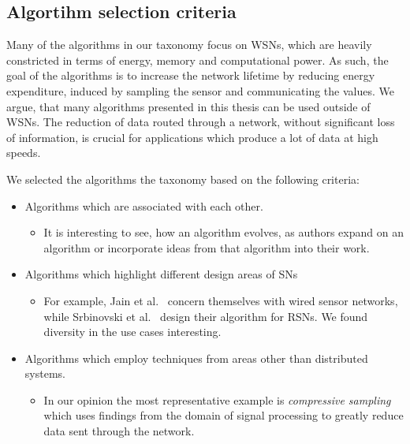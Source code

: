 \subsection{Algortihm selection criteria}
\label{sec:Algortihm selection criteria}

Many of the algorithms in our taxonomy focus on \acp{WSN}, which are heavily
constricted in terms of energy, memory and computational power. As such, the
goal of the algorithms is to increase the network lifetime by reducing energy
expenditure, induced by sampling the sensor and communicating the values. We
argue, that many algorithms presented in this thesis can be used outside of
\acp{WSN}. The reduction of data routed through a network, without significant
loss of information, is crucial for applications which produce a lot of data at
high speeds.

We selected the algorithms the taxonomy based on the following criteria:

\begin{itemize}
    \item Algorithms which are associated with each other.
    \begin{itemize}
        \item It is interesting to see, how an algorithm evolves, as authors
        expand on an algorithm or incorporate ideas from that algorithm into
        their work.
    \end{itemize}
    \item Algorithms which highlight different design areas of \acp{SN}
    \begin{itemize}
        \item For example, Jain et al.~\cite{jain2004adaptive} concern
        themselves with wired sensor networks, while Srbinovski et
        al.~\cite{srbinovski2016energy} design their algorithm for \acp{RSN}.
        We found diversity in the use cases interesting.
    \end{itemize}
    \item Algorithms which employ techniques from areas other than distributed
    systems. 
    \begin{itemize}
        \item In our opinion the most representative example is
        \textit{compressive sampling} which uses findings from the domain of
        signal processing to greatly reduce data sent through the network.
    \end{itemize}
\end{itemize}

